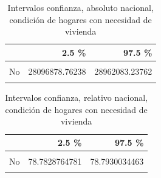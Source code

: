 \documentclass[
]{article}
\newenvironment{Shaded}{\begin{snugshade}}{\end{snugshade}}
\newcommand{\DataTypeTok}[1]{\textcolor[rgb]{0.13,0.29,0.53}{#1}}
\newcommand{\KeywordTok}[1]{\textcolor[rgb]{0.13,0.29,0.53}{\textbf{#1}}}
\newcommand{\NormalTok}[1]{#1}
\newcommand{\OperatorTok}[1]{\textcolor[rgb]{0.81,0.36,0.00}{\textbf{#1}}}
\newcommand{\StringTok}[1]{\textcolor[rgb]{0.31,0.60,0.02}{#1}}
\begin{document}
\begin{table}[H]

\caption{\label{tab:unnamed-chunk-18}Intervalos confianza, absoluto nacional, 
    condición de hogares con necesidad de vivienda}
\centering
\begin{tabular}[t]{lrr}
\toprule
  & 2.5 \% & 97.5 \%\\
\midrule
\cellcolor{gray!6}{Si} & \cellcolor{gray!6}{7420887.67965} & \cellcolor{gray!6}{7836236.32035}\\
No & 28096878.76238 & 28962083.23762\\
\cellcolor{gray!6}{No sabe} & \cellcolor{gray!6}{38095.28695} & \cellcolor{gray!6}{66752.71305}\\
\bottomrule
\end{tabular}
\end{table}

\begin{Shaded}
\end{Shaded}

\begin{table}[H]

\caption{\label{tab:unnamed-chunk-19}Intervalos confianza, relativo nacional, 
    condición de hogares con necesidad de vivienda}
\centering
\begin{tabular}[t]{lrr}
\toprule
  & 2.5 \% & 97.5 \%\\
\midrule
\cellcolor{gray!6}{Si} & \cellcolor{gray!6}{21.0622346404} & \cellcolor{gray!6}{21.0723337980}\\
No & 78.7828764781 & 78.7930034463\\
\cellcolor{gray!6}{No sabe} & \cellcolor{gray!6}{0.1443797079} & \cellcolor{gray!6}{0.1451719292}\\
\bottomrule
\end{tabular}
\end{table}
\end{document}
